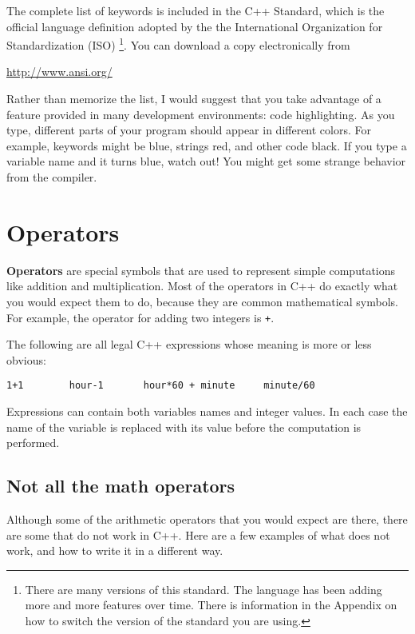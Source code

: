 The complete list of keywords is included in the C++ Standard, which
is the official language definition adopted by the the International
Organization for Standardization (ISO) \footnote{There are many versions
of this standard. The language has been adding more and more features over
time. There is information in the Appendix on how to switch the version of the
standard you are using.}.  You
can download a copy electronically from
\bigskip

    \url{http://www.ansi.org/}
%
\bigskip

Rather than memorize the list, I would suggest that you
take advantage of a feature provided in many development
environments: code highlighting.  As you type, different
parts of your program should appear in different colors.  For
example, keywords might be blue, strings red, and other code
black.  If you type a variable name and it turns blue, watch
out!  You might get some strange behavior from the compiler.

\section{Operators}

{\bf Operators} are special symbols that are used to represent
simple computations like addition and multiplication.  Most
of the operators in C++ do exactly what you would expect them
to do, because they are common mathematical symbols.  For
example, the operator for adding two integers is {\tt +}.

The following are all legal C++ expressions whose meaning is
more or less obvious:

\begin{verbatim}
1+1        hour-1       hour*60 + minute     minute/60
\end{verbatim}
%
Expressions can contain both variables
names and integer values.  In each case the name of the variable is
replaced with its value before the computation is performed.


\subsection{Not all the math operators}
Although some of the arithmetic operators that you would expect are there, there are some that do not work in C++. Here are a few examples of what does not work, and how to write it in a different way.


